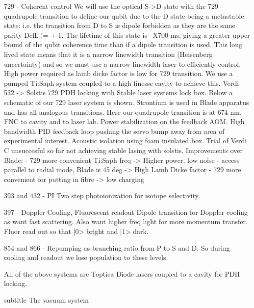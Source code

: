 \documentclass{article}
\begin{document}
729 - Coherent control
We will use the optical S->D state with the 729 quadrupole transition
to define our qubit due to the D state being a metastable state:
i.e. the transition from D to S is dipole forbidden as they are the
same parity DelL != +-1. The lifetime of this state is ~X700 ms,
giving a greater upper bound of the qubit coherence time than if a
dipole transition is used. This long lived state means that it is a
narrow linewidth transition (Heisenberg uncertainty) and so we must
use a narrow linewidth laser to efficiently control.  High power
required as lamb dicke factor is low for 729 transition.  We use a
pumped Ti:Saph system coupled to a high finesse cavity to achieve
this.  Verdi 532 -> Solstis 729 PDH locking with Stable laser systems
lock box. Below a schematic of our 729 laser system is
shown. Strontium is used in Blade apparatus and has all analogous
transitions. Here our quadrupole transition is at 674 nm.  FNC to
cavity and to laser lab. Power stabilization on the feedback AOM. High
bandwidth PID feedback loop pushing the servo bump away from area of
experimental interest. Acoustic isolation using foam insulated box.
Trial of Verdi C unsuccesful so far not achieving stable lasing with
solstis.
Improvements over Blade:
- 729 more convenient Ti:Saph freq -> Higher power, low noise
- access parallel to radial mode, Blade is 45 deg -> High Lamb Dicke
factor
- 729 more convenient for putting in fibre -> low charging


393 and 432 - PI 
Two step photoionization for isotope selectivity.

397 - Doppler Cooling, Fluorescent readout
Dipole transition for Doppler cooling as want fast scattering. Also
want higher freq light for more momentum transfer.
Fluor read out so that |0> bright and |1> dark.

854 and 866 - Repumping as branching ratio from P to S and D. So
during cooling and readout we lose population to these levels.

All of the above systems are Toptica Diode lasers coupled to a cavity
for PDH locking.


subtitle The vacuum system\\
\end{document}
